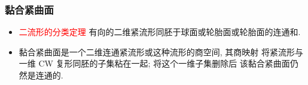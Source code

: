 \documentclass[UTF8]{ctexbeamer}	%
\theoremstyle{plain}
\theoremstyle{definition}
\theoremstyle{remark}
\numberwithin{equation}{section}
\begin{document}
\begin{frame}
    \frametitle{黏合紧曲面}
    \begin{itemize}
        \item
              \textcolor{red}{二流形的分类定理} \newline
              有向的二维紧流形同胚于球面或轮胎面或轮胎面的连通和.
              \begin{figure}[!htb]
                \centering
                 \qquad
            \end{figure}


        \item 黏合紧曲面是一个二维连通紧流形或这种流形的商空间, 其商映射
              将紧流形与一维 CW 复形同胚的子集粘在一起; 将这个一维子集删除后
              该黏合紧曲面仍然是连通的.
    \end{itemize}
\end{frame}
\end{document}
